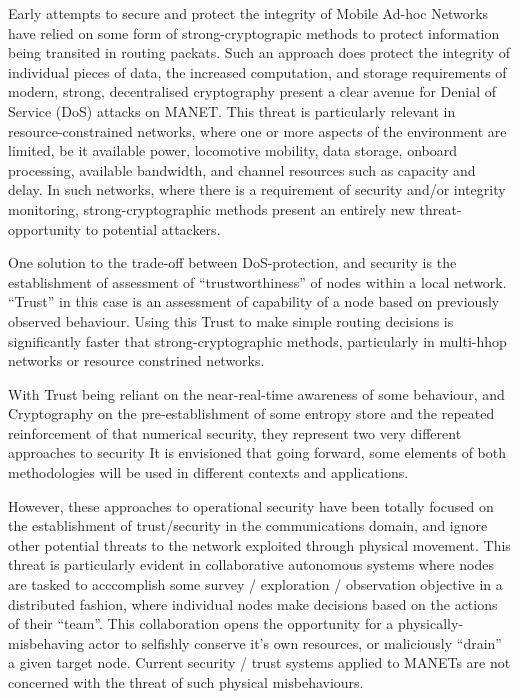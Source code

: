 \documentclass[conference]{IEEEtran}
\begin{document}
Early attempts to secure and protect the integrity of Mobile Ad-hoc Networks have relied on some form of strong-cryptograpic methods to protect information being transited in routing packats.
Such an approach does protect the integrity of individual pieces of data, the increased computation, and storage requirements of modern, strong, decentralised cryptography present a clear avenue for Denial of Service (DoS) attacks on MANET.
This threat is particularly relevant in resource-constrained networks, where one or more aspects of the environment are limited, be it available power, locomotive mobility, data storage, onboard processing, available bandwidth, and channel resources such as capacity and delay.
In such networks, where there is a requirement of security and/or integrity monitoring, strong-cryptographic methods present an entirely new threat-opportunity to potential attackers.

One solution to the trade-off between DoS-protection, and security is the establishment of assessment of ``trustworthiness'' of nodes within a local network. 
``Trust'' in this case is an assessment of capability of a node based on previously observed behaviour.
Using this Trust to make simple routing decisions is significantly faster that strong-cryptographic methods, particularly in multi-hhop networks or resource constrined networks\cite{Cordasco2008}.

With Trust being reliant on the near-real-time awareness of some behaviour, and Cryptography on the pre-establishment of some entropy store and the repeated reinforcement of that numerical security, they represent two very different approaches to security
It is envisioned that going forward, some elements of both methodologies will be used in different contexts and applications. 

However, these approaches to operational security have been totally focused on the establishment of trust/security in the communications domain, and ignore other potential threats to the network exploited through physical movement.
This threat is particularly evident in collaborative autonomous systems where nodes are tasked to acccomplish some survey / exploration / observation objective in a distributed fashion, where individual nodes make decisions based on the actions of their ``team''. 
This collaboration opens the opportunity for a physically-misbehaving actor to selfishly conserve it's own resources, or maliciously ``drain'' a given target node.
Current security / trust systems applied to MANETs are not concerned with the threat of such physical misbehaviours.
\end{document}
